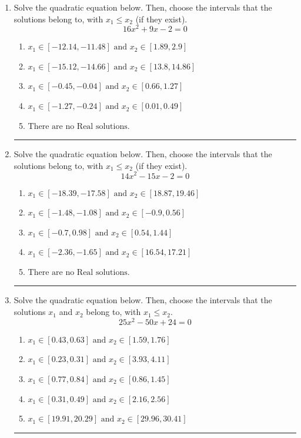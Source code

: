 \documentclass[14pt]{extbook}
\newcommand{\litem}[1]{\item#1\hspace*{-1cm}\rule{\textwidth}{0.4pt}}
\begin{document}
\begin{enumerate}
\litem{
Solve the quadratic equation below. Then, choose the intervals that the solutions belong to, with $x_1 \leq x_2$ (if they exist).\[ 16x^{2} +9 x -2 = 0 \]\begin{enumerate}[label=\Alph*.]
\item \( x_1 \in [-12.14, -11.48] \text{ and } x_2 \in [1.89, 2.9] \)
\item \( x_1 \in [-15.12, -14.66] \text{ and } x_2 \in [13.8, 14.86] \)
\item \( x_1 \in [-0.45, -0.04] \text{ and } x_2 \in [0.66, 1.27] \)
\item \( x_1 \in [-1.27, -0.24] \text{ and } x_2 \in [0.01, 0.49] \)
\item \( \text{There are no Real solutions.} \)

\end{enumerate} }
\litem{
Solve the quadratic equation below. Then, choose the intervals that the solutions belong to, with $x_1 \leq x_2$ (if they exist).\[ 14x^{2} -15 x -2 = 0 \]\begin{enumerate}[label=\Alph*.]
\item \( x_1 \in [-18.39, -17.58] \text{ and } x_2 \in [18.87, 19.46] \)
\item \( x_1 \in [-1.48, -1.08] \text{ and } x_2 \in [-0.9, 0.56] \)
\item \( x_1 \in [-0.7, 0.98] \text{ and } x_2 \in [0.54, 1.44] \)
\item \( x_1 \in [-2.36, -1.65] \text{ and } x_2 \in [16.54, 17.21] \)
\item \( \text{There are no Real solutions.} \)

\end{enumerate} }
\litem{
Solve the quadratic equation below. Then, choose the intervals that the solutions $x_1$ and $x_2$ belong to, with $x_1 \leq x_2$.\[ 25x^{2} -50 x + 24 = 0 \]\begin{enumerate}[label=\Alph*.]
\item \( x_1 \in [0.43, 0.63] \text{ and } x_2 \in [1.59, 1.76] \)
\item \( x_1 \in [0.23, 0.31] \text{ and } x_2 \in [3.93, 4.11] \)
\item \( x_1 \in [0.77, 0.84] \text{ and } x_2 \in [0.86, 1.45] \)
\item \( x_1 \in [0.31, 0.49] \text{ and } x_2 \in [2.16, 2.56] \)
\item \( x_1 \in [19.91, 20.29] \text{ and } x_2 \in [29.96, 30.41] \)


\end{enumerate}}
\end{enumerate}
\end{document}
